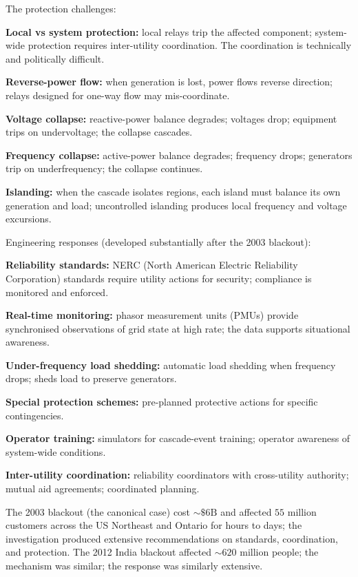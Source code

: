 The protection challenges:

\textbf{Local vs system protection:} local relays trip the affected component; system-wide protection requires inter-utility coordination. The coordination is technically and politically difficult.

\textbf{Reverse-power flow:} when generation is lost, power flows reverse direction; relays designed for one-way flow may mis-coordinate.

\textbf{Voltage collapse:} reactive-power balance degrades; voltages drop; equipment trips on undervoltage; the collapse cascades.

\textbf{Frequency collapse:} active-power balance degrades; frequency drops; generators trip on underfrequency; the collapse continues.

\textbf{Islanding:} when the cascade isolates regions, each island must balance its own generation and load; uncontrolled islanding produces local frequency and voltage excursions.

Engineering responses (developed substantially after the 2003 blackout):

\textbf{Reliability standards:} NERC (North American Electric Reliability Corporation) standards require utility actions for security; compliance is monitored and enforced.

\textbf{Real-time monitoring:} phasor measurement units (PMUs) provide synchronised observations of grid state at high rate; the data supports situational awareness.

\textbf{Under-frequency load shedding:} automatic load shedding when frequency drops; sheds load to preserve generators.

\textbf{Special protection schemes:} pre-planned protective actions for specific contingencies.

\textbf{Operator training:} simulators for cascade-event training; operator awareness of system-wide conditions.

\textbf{Inter-utility coordination:} reliability coordinators with cross-utility authority; mutual aid agreements; coordinated planning.

The 2003 blackout (the canonical case) cost $\sim\$6\text{B}$ and affected $55$ million customers across the US Northeast and Ontario for hours to days; the investigation produced extensive recommendations on standards, coordination, and protection. The 2012 India blackout affected $\sim 620$ million people; the mechanism was similar; the response was similarly extensive.

